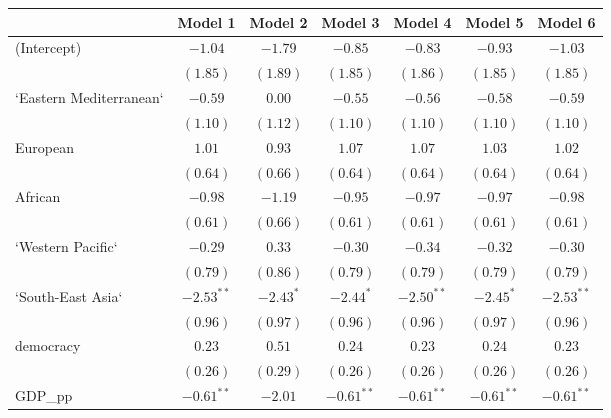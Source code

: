 
\begin{table}[!h]
\begin{center}
\begin{tabular}{l c c c c c c }
\toprule
 & Model 1 & Model 2 & Model 3 & Model 4 & Model 5 & Model 6 \\
\midrule
(Intercept)             & $-1.04$      & $-1.79$      & $-0.85$      & $-0.83$      & $-0.93$      & $-1.03$      \\
                        & $(1.85)$     & $(1.89)$     & $(1.85)$     & $(1.86)$     & $(1.85)$     & $(1.85)$     \\
`Eastern Mediterranean` & $-0.59$      & $0.00$       & $-0.55$      & $-0.56$      & $-0.58$      & $-0.59$      \\
                        & $(1.10)$     & $(1.12)$     & $(1.10)$     & $(1.10)$     & $(1.10)$     & $(1.10)$     \\
European                & $1.01$       & $0.93$       & $1.07$       & $1.07$       & $1.03$       & $1.02$       \\
                        & $(0.64)$     & $(0.66)$     & $(0.64)$     & $(0.64)$     & $(0.64)$     & $(0.64)$     \\
African                 & $-0.98$      & $-1.19$      & $-0.95$      & $-0.97$      & $-0.97$      & $-0.98$      \\
                        & $(0.61)$     & $(0.66)$     & $(0.61)$     & $(0.61)$     & $(0.61)$     & $(0.61)$     \\
`Western Pacific`       & $-0.29$      & $0.33$       & $-0.30$      & $-0.34$      & $-0.32$      & $-0.30$      \\
                        & $(0.79)$     & $(0.86)$     & $(0.79)$     & $(0.79)$     & $(0.79)$     & $(0.79)$     \\
`South-East Asia`       & $-2.53^{**}$ & $-2.43^{*}$  & $-2.44^{*}$  & $-2.50^{**}$ & $-2.45^{*}$  & $-2.53^{**}$ \\
                        & $(0.96)$     & $(0.97)$     & $(0.96)$     & $(0.96)$     & $(0.97)$     & $(0.96)$     \\
democracy               & $0.23$       & $0.51$       & $0.24$       & $0.23$       & $0.24$       & $0.23$       \\
                        & $(0.26)$     & $(0.29)$     & $(0.26)$     & $(0.26)$     & $(0.26)$     & $(0.26)$     \\
GDP\_pp                 & $-0.61^{**}$ & $-2.01$      & $-0.61^{**}$ & $-0.61^{**}$ & $-0.61^{**}$ & $-0.61^{**}$ \\

\end{tabular}
\end{center}
\end{table}
